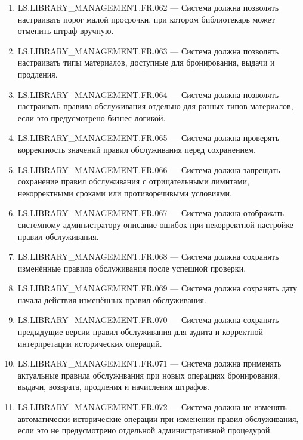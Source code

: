 \documentclass[12pt,a4paper]{article}
\begin{document}
\begin{enumerate}
		\item LS.LIBRARY\_MANAGEMENT.FR.062 --- Система должна позволять настраивать
		порог малой просрочки, при котором библиотекарь может отменить штраф вручную.
		
		\item LS.LIBRARY\_MANAGEMENT.FR.063 --- Система должна позволять настраивать
		типы материалов, доступные для бронирования, выдачи и продления.
		
		\item LS.LIBRARY\_MANAGEMENT.FR.064 --- Система должна позволять настраивать
		правила обслуживания отдельно для разных типов материалов, если это предусмотрено
		бизнес-логикой.
		
		\item LS.LIBRARY\_MANAGEMENT.FR.065 --- Система должна проверять корректность
		значений правил обслуживания перед сохранением.
		
		\item LS.LIBRARY\_MANAGEMENT.FR.066 --- Система должна запрещать сохранение
		правил обслуживания с отрицательными лимитами, некорректными сроками или
		противоречивыми условиями.
		
		\item LS.LIBRARY\_MANAGEMENT.FR.067 --- Система должна отображать системному
		администратору описание ошибок при некорректной настройке правил обслуживания.
		
		\item LS.LIBRARY\_MANAGEMENT.FR.068 --- Система должна сохранять изменённые
		правила обслуживания после успешной проверки.
		
		\item LS.LIBRARY\_MANAGEMENT.FR.069 --- Система должна сохранять дату начала
		действия изменённых правил обслуживания.
		
		\item LS.LIBRARY\_MANAGEMENT.FR.070 --- Система должна сохранять предыдущие
		версии правил обслуживания для аудита и корректной интерпретации исторических
		операций.
		
		\item LS.LIBRARY\_MANAGEMENT.FR.071 --- Система должна применять актуальные
		правила обслуживания при новых операциях бронирования, выдачи, возврата,
		продления и начисления штрафов.
		
		\item LS.LIBRARY\_MANAGEMENT.FR.072 --- Система должна не изменять автоматически
		исторические операции при изменении правил обслуживания, если это не предусмотрено
		отдельной административной процедурой.
		

\end{enumerate}
\end{document}
